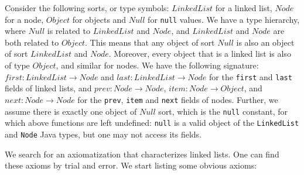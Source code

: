 \documentclass[runningheads]{llncs}
\begin{document}
Consider the following sorts, or type symbols: $\mathit{LinkedList}$ for a linked list, $\mathit{Node}$ for a node, $\mathit{Object}$ for objects and $\mathit{Null}$ for \texttt{null} values. We have a type hierarchy, where $\mathit{Null}$ is related to $\mathit{LinkedList}$ and $\mathit{Node}$, and $\mathit{LinkedList}$ and $\mathit{Node}$ are both related to $\mathit{Object}$. This means that any object of sort $\mathit{Null}$ is also an object of sort $\mathit{LinkedList}$ and $\mathit{Node}$. Moreover, every object that is a linked list is also of type $\mathit{Object}$, and similar for nodes.
We have the following signature: $\mathit{first}: \mathit{LinkedList}\to \mathit{Node}$ and $\mathit{last}: \mathit{LinkedList}\to \mathit{Node}$ for the \texttt{first} and \texttt{last} fields of linked lists, and $\mathit{prev}: \mathit{Node}\to \mathit{Node}$, $\mathit{item}: \mathit{Node}\to \mathit{Object}$, and $\mathit{next}: \mathit{Node}\to \mathit{Node}$ for the \texttt{prev}, \texttt{item} and \texttt{next} fields of nodes. Further, we assume there is exactly one object of $\mathit{Null}$ sort, which is the \texttt{null} constant, for which above functions are left undefined: \texttt{null} is a valid object of the \texttt{LinkedList} and \texttt{Node} Java types, but one may not access its fields.

We search for an axiomatization that characterizes linked lists. One can find these axioms by trial and error. We start listing some obvious axioms:
\end{document}
